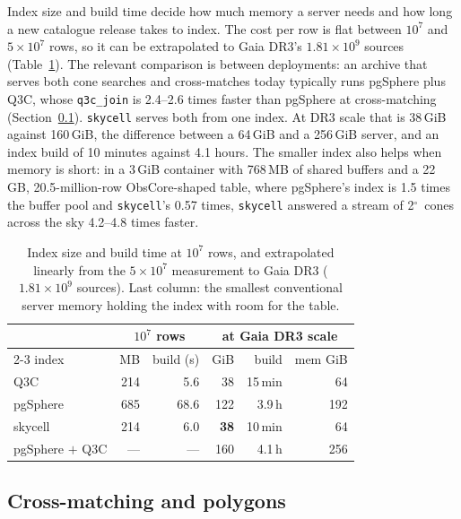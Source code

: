 \documentclass[preprint,12pt]{elsarticle}
\newcommand{\degr}{\ensuremath{^{\circ}}}
\newcommand{\Sect}{Section}
\begin{document}
Index size and build time decide how much memory a server needs and how long a new
catalogue release takes to index. The cost per row is flat between $10^7$ and $5\times10^7$ rows, so it can be
extrapolated to Gaia DR3's $1.81\times10^9$ sources (Table~\ref{tab:gaia}). The
relevant comparison is between deployments: an archive that serves both cone searches
and cross-matches today typically runs pgSphere plus Q3C, whose \texttt{q3c\_join} is
2.4--2.6 times faster than pgSphere at cross-matching (\Sect~\ref{sec:xmatch}).
\texttt{skycell} serves both from one index. At DR3 scale that is 38\,GiB against
160\,GiB, the difference between a 64\,GiB and a 256\,GiB server, and an index build of
10 minutes against 4.1 hours. The smaller index also helps when memory is short: in a
3\,GiB container with 768\,MB of shared buffers and a 22\,GB, 20.5-million-row
ObsCore-shaped table, where pgSphere's index is 1.5 times the buffer pool and
\texttt{skycell}'s 0.57 times, \texttt{skycell} answered a stream of 2\degr\ cones
across the sky 4.2--4.8 times faster.

\begin{table}
  \caption{Index size and build time at $10^7$ rows, and extrapolated linearly from the
    $5\times10^7$ measurement to Gaia DR3 ($1.81\times10^9$ sources). Last column: the
    smallest conventional server memory holding the index with room for the table.}
  \label{tab:gaia}
  \centering
  \footnotesize
  \begin{tabular}{@{}l rr rrr@{}}
    \hline\hline
    & \multicolumn{2}{c}{$10^7$ rows} & \multicolumn{3}{c}{at Gaia DR3 scale} \\
    \cline{2-3}\cline{4-6}
    index & MB & build (s) & GiB & build & mem GiB \\
    \hline
    Q3C              & 214 &  5.6 & 38 & 15\,min & 64 \\
    pgSphere         & 685 & 68.6 & 122 & 3.9\,h & 192 \\
    skycell          & 214 &  6.0 & \textbf{38} & 10\,min & 64 \\
    \hline
    pgSphere $+$ Q3C & --- & --- & 160 & 4.1\,h & 256 \\
    \hline
  \end{tabular}
\end{table}

\subsection{Cross-matching and polygons}
\label{sec:xmatch}
\label{sec:otherops}
\end{document}
